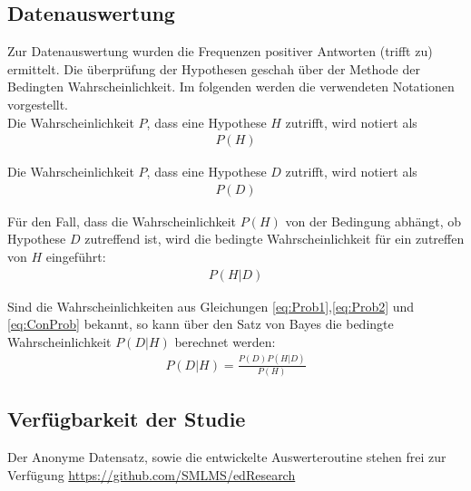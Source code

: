 \subsection{Datenauswertung}
Zur Datenauswertung wurden die Frequenzen positiver Antworten (trifft zu) ermittelt. Die überprüfung der Hypothesen geschah über der Methode der Bedingten Wahrscheinlichkeit. Im folgenden werden die verwendeten Notationen vorgestellt.\\
\noindent
Die Wahrscheinlichkeit $P$, dass eine Hypothese $H$ zutrifft, wird notiert als
\begin{align}
	\label{eq:Prob1}
	P(H)
\end{align}

\noindent
Die Wahrscheinlichkeit $P$, dass eine Hypothese $D$ zutrifft, wird notiert als
\begin{align}
\label{eq:Prob2}
	P(D)
\end{align}

\noindent
Für den Fall, dass die Wahrscheinlichkeit $P(H)$ von der Bedingung abhängt, ob Hypothese $D$ zutreffend ist, wird die bedingte Wahrscheinlichkeit für ein zutreffen von $H$ eingeführt:
\begin{align}
\label{eq:ConProb}
	P(H|D)
\end{align}

\noindent
Sind die Wahrscheinlichkeiten aus Gleichungen \eqref{eq:Prob1},\eqref{eq:Prob2} und \eqref{eq:ConProb} bekannt, so kann über den Satz von Bayes die bedingte Wahrscheinlichkeit $P(D|H)$ berechnet werden:
\begin{align}
\label{eq:Bayes}
	P(D|H) = \frac{P(D)P(H|D)}{P(H)}
\end{align}

\subsection{Verfügbarkeit der Studie}
Der Anonyme Datensatz, sowie die entwickelte Auswerteroutine stehen frei zur Verfügung \url{https://github.com/SMLMS/edResearch} 